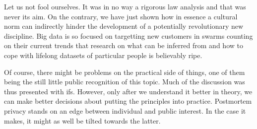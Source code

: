 \documentclass[a4paper]{article}
\begin{document}
Let us not fool ourselves. It was in no way a rigorous law analysis and that was never its aim. On the contrary, we have just shown how in essence a cultural norm can indirectly hinder the development of a potentially revolutionary new discipline.
Big data is so focused on targetting new customers in swarms counting on their current trends that research on what can be inferred from and how to cope with lifelong datasets of particular people is believably  ripe.

Of course, there might be problems on the practical side of things, one of them being the still little public recognition of this topic. Much of the discussion was thus presented with ifs. However, only after we understand it better in theory, we can make better decisions about putting the principles into practice. Postmortem privacy stands on an edge between individual and public interest. In the case it makes, it might as well be tilted towards the latter.
\end{document}
